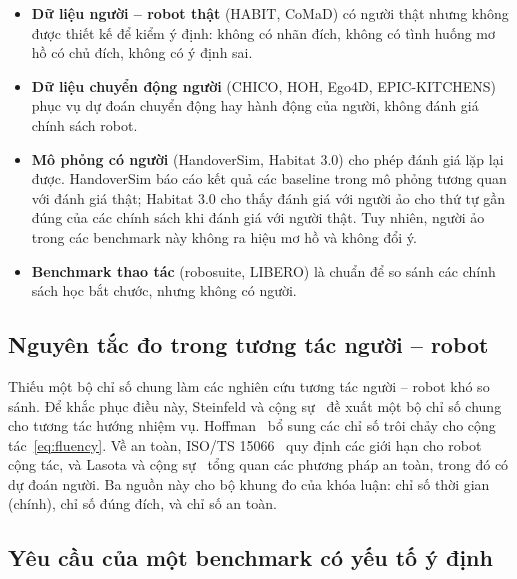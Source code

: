 \begin{itemize}
  \item \textbf{Dữ liệu người -- robot thật} (HABIT, CoMaD) có người thật nhưng không được thiết kế để kiểm ý định: không có nhãn đích, không có tình huống mơ hồ có chủ đích, không có ý định sai.
  \item \textbf{Dữ liệu chuyển động người} (CHICO, HOH, Ego4D, EPIC-KITCHENS) phục vụ dự đoán chuyển động hay hành động của người, không đánh giá chính sách robot.
  \item \textbf{Mô phỏng có người} (HandoverSim, Habitat 3.0) cho phép đánh giá lặp lại được. HandoverSim báo cáo kết quả các baseline trong mô phỏng tương quan với đánh giá thật; Habitat 3.0 cho thấy đánh giá với người ảo cho thứ tự gần đúng của các chính sách khi đánh giá với người thật. Tuy nhiên, người ảo trong các benchmark này không ra hiệu mơ hồ và không đổi ý.
  \item \textbf{Benchmark thao tác} (robosuite, LIBERO) là chuẩn để so sánh các chính sách học bắt chước, nhưng không có người.
\end{itemize}

\subsection{Nguyên tắc đo trong tương tác người -- robot}

Thiếu một bộ chỉ số chung làm các nghiên cứu tương tác người -- robot khó so sánh. Để khắc phục điều này, Steinfeld và cộng sự~\cite{steinfeld2006metrics} đề xuất một bộ chỉ số chung cho tương tác hướng nhiệm vụ. Hoffman~\cite{hoffman2019fluency} bổ sung các chỉ số trôi chảy cho cộng tác~\eqref{eq:fluency}. Về an toàn, ISO/TS 15066~\cite{iso15066} quy định các giới hạn cho robot cộng tác, và Lasota và cộng sự~\cite{lasota2017survey} tổng quan các phương pháp an toàn, trong đó có dự đoán người. Ba nguồn này cho bộ khung đo của khóa luận: chỉ số thời gian (chính), chỉ số đúng đích, và chỉ số an toàn.

\subsection{Yêu cầu của một benchmark có yếu tố ý định}

